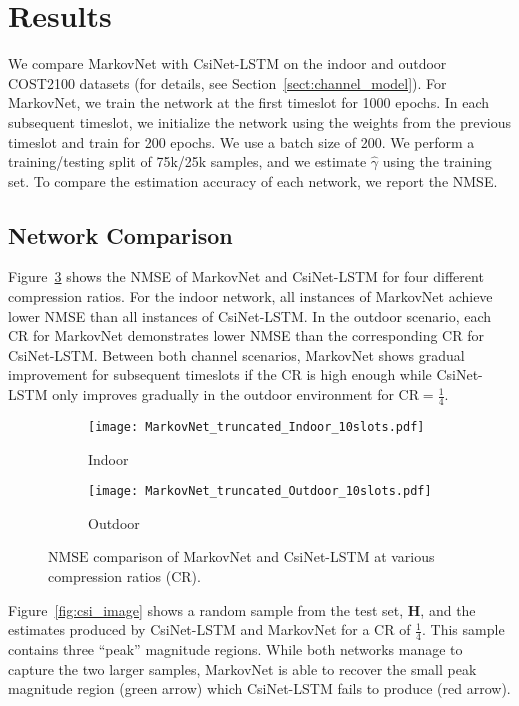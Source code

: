 \section{Results} \label{sec:markov-results}

We compare MarkovNet with CsiNet-LSTM \cite{ref:Wang2019CsiNetLSTM} on the indoor and outdoor COST2100 datasets (for details, see Section~\ref{sect:channel_model}). For MarkovNet, we train the network at the first timeslot for 1000 epochs. In each subsequent timeslot, we initialize the network using the weights from the previous timeslot and train for 200 epochs. We use a batch size of 200. We perform a training/testing split of 75k/25k samples, and we estimate $\hat\gamma$ using the training set. To compare the estimation accuracy of each network, we report the NMSE.

\subsection{Network Comparison}

Figure~\ref{fig:diffnet_result} shows the NMSE of MarkovNet and CsiNet-LSTM for four different compression ratios. For the indoor network, all instances of MarkovNet achieve lower NMSE than all instances of CsiNet-LSTM. In the outdoor scenario, each CR for MarkovNet demonstrates lower NMSE than the corresponding CR for CsiNet-LSTM. Between both channel scenarios, MarkovNet shows gradual improvement for subsequent timeslots if the CR is high enough while CsiNet-LSTM only improves gradually in the outdoor environment for CR$=\frac 14$.
\begin{figure}[!hbtp] \centering 
	\begin{subfigure}[t]{.48\textwidth}
		\centering
		\texttt{[image: MarkovNet\_truncated\_Indoor\_10slots.pdf]}
		\caption{Indoor}
		\label{fig:diffnet_indoor} 
	\end{subfigure}
	\begin{subfigure}[t]{.48\textwidth}
		\centering
		\texttt{[image: MarkovNet\_truncated\_Outdoor\_10slots.pdf]}
		\caption{Outdoor}
		\label{fig:diffnet_outdoor} 
	\end{subfigure}
	\caption{$\text{NMSE}$ comparison of MarkovNet and CsiNet-LSTM 
	at various compression ratios (CR).} 
	\label{fig:diffnet_result} \vspace*{-2mm}
\end{figure}  
Figure~\ref{fig:csi_image} shows a random sample from the test set, $\mathbf H$, and the estimates produced by CsiNet-LSTM and MarkovNet for a CR of $\frac 14$. This sample contains three ``peak'' magnitude regions. While both networks manage to capture the two larger samples, MarkovNet is able to recover the small peak magnitude region ({\color{darkgreen}green arrow}) which CsiNet-LSTM fails to produce ({\color{red}red arrow}).

